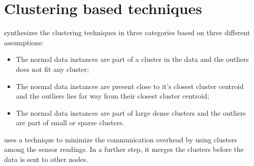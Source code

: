 \newpage


\section{Clustering based techniques}
\label{sec:clustbased}

\cite{gen:chandola:2009} synthesizes the clustering techniques in three categories based on three different assumptions: 

\begin{itemize}
	
	\setlength\itemsep{-0.5em}
	
	\item The normal data instances are part of a cluster in the data and the outliers does not fit any cluster;
	
	\item The normal data instances are present close to it's closest cluster centroid and the outliers lies far way from their closest cluster centroid;
	
	\item The normal data instances are part of large dense clusters and the outliers are part of small or sparse clusters.
	
\end{itemize}

\cite{clust:rajasegarar:2006} uses a technique to minimize the communication overhead by using clusters among the sensor readings. In a further step, it merges the clusters before the data is sent to other nodes.
